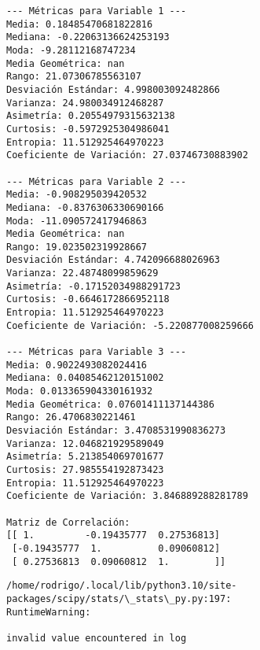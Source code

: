\documentclass[11pt]{article}
\begin{document}
    \begin{Verbatim}[commandchars=\\\{\}]
--- Métricas para Variable 1 ---
Media: 0.18485470681822816
Mediana: -0.22063136624253193
Moda: -9.28112168747234
Media Geométrica: nan
Rango: 21.07306785563107
Desviación Estándar: 4.998003092482866
Varianza: 24.980034912468287
Asimetría: 0.20554979315632138
Curtosis: -0.5972925304986041
Entropia: 11.512925464970223
Coeficiente de Variación: 27.03746730883902

--- Métricas para Variable 2 ---
Media: -0.908295039420532
Mediana: -0.8376306330690166
Moda: -11.090572417946863
Media Geométrica: nan
Rango: 19.023502319928667
Desviación Estándar: 4.742096688026963
Varianza: 22.48748099859629
Asimetría: -0.17152034988291723
Curtosis: -0.6646172866952118
Entropia: 11.512925464970223
Coeficiente de Variación: -5.220877008259666

--- Métricas para Variable 3 ---
Media: 0.9022493082024416
Mediana: 0.04085462120151002
Moda: 0.013365904330161932
Media Geométrica: 0.07601411137144386
Rango: 26.4706830221461
Desviación Estándar: 3.4708531990836273
Varianza: 12.046821929589049
Asimetría: 5.213854069701677
Curtosis: 27.985554192873423
Entropia: 11.512925464970223
Coeficiente de Variación: 3.846889288281789

Matriz de Correlación:
[[ 1.         -0.19435777  0.27536813]
 [-0.19435777  1.          0.09060812]
 [ 0.27536813  0.09060812  1.        ]]
    \end{Verbatim}

    \begin{Verbatim}[commandchars=\\\{\}]
/home/rodrigo/.local/lib/python3.10/site-packages/scipy/stats/\_stats\_py.py:197:
RuntimeWarning:

invalid value encountered in log

    \end{Verbatim}

    \begin{center}
    \end{center}
    { \hspace*{\fill} \\}
    
    \begin{center}
    \end{center}
    { \hspace*{\fill} \\}
    
\end{document}
